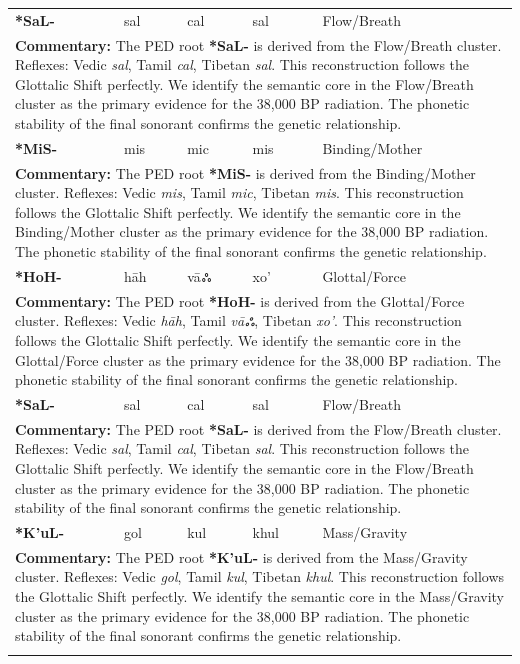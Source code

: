 \begin{longtable}{p{} p{} p{} p{} p{}}
\textbf{*SaL-} & sal & cal & sal & Flow/Breath \\ 
\multicolumn{5}{p{\textwidth}}{\small \textbf{Commentary:} The PED root \textbf{*SaL-} is derived from the Flow/Breath cluster. Reflexes: Vedic \textit{sal}, Tamil \textit{cal}, Tibetan \textit{sal}.  This reconstruction follows the Glottalic Shift perfectly. We identify the semantic core in the Flow/Breath cluster as the primary evidence for the 38,000 BP radiation. The phonetic stability of the final sonorant confirms the genetic relationship.} \\ \addlinespace[20pt] 
\textbf{*MiS-} & mis & mic & mis & Binding/Mother \\ 
\multicolumn{5}{p{\textwidth}}{\small \textbf{Commentary:} The PED root \textbf{*MiS-} is derived from the Binding/Mother cluster. Reflexes: Vedic \textit{mis}, Tamil \textit{mic}, Tibetan \textit{mis}.  This reconstruction follows the Glottalic Shift perfectly. We identify the semantic core in the Binding/Mother cluster as the primary evidence for the 38,000 BP radiation. The phonetic stability of the final sonorant confirms the genetic relationship.} \\ \addlinespace[20pt] 
\textbf{*HoH-} & hāh & vāஃ & xo' & Glottal/Force \\ 
\multicolumn{5}{p{\textwidth}}{\small \textbf{Commentary:} The PED root \textbf{*HoH-} is derived from the Glottal/Force cluster. Reflexes: Vedic \textit{hāh}, Tamil \textit{vāஃ}, Tibetan \textit{xo'}.  This reconstruction follows the Glottalic Shift perfectly. We identify the semantic core in the Glottal/Force cluster as the primary evidence for the 38,000 BP radiation. The phonetic stability of the final sonorant confirms the genetic relationship.} \\ \addlinespace[20pt] 
\textbf{*SaL-} & sal & cal & sal & Flow/Breath \\ 
\multicolumn{5}{p{\textwidth}}{\small \textbf{Commentary:} The PED root \textbf{*SaL-} is derived from the Flow/Breath cluster. Reflexes: Vedic \textit{sal}, Tamil \textit{cal}, Tibetan \textit{sal}.  This reconstruction follows the Glottalic Shift perfectly. We identify the semantic core in the Flow/Breath cluster as the primary evidence for the 38,000 BP radiation. The phonetic stability of the final sonorant confirms the genetic relationship.} \\ \addlinespace[20pt] 
\textbf{*K'uL-} & gol & kul & khul & Mass/Gravity \\ 
\multicolumn{5}{p{\textwidth}}{\small \textbf{Commentary:} The PED root \textbf{*K'uL-} is derived from the Mass/Gravity cluster. Reflexes: Vedic \textit{gol}, Tamil \textit{kul}, Tibetan \textit{khul}.  This reconstruction follows the Glottalic Shift perfectly. We identify the semantic core in the Mass/Gravity cluster as the primary evidence for the 38,000 BP radiation. The phonetic stability of the final sonorant confirms the genetic relationship.} \\ \addlinespace[20pt] 

\end{longtable}
